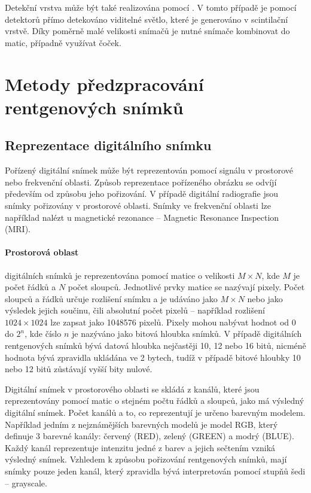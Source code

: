 Detekční vrstva může být také realizována pomocí . V tomto případě je pomocí  detektorů přímo detekováno viditelné světlo, které je generováno v scintilační vrstvě. Díky poměrně malé velikosti  snímačů je nutné snímače kombinovat do matic, případně využívat čoček.

\section{Metody předzpracování rentgenových snímků}

\subsection{Reprezentace digitálního snímku}
Pořízený digitální snímek může být reprezentován pomocí signálu v prostorové nebo frekvenční oblasti. Způsob reprezentace pořízeného obrázku se odvíjí především od způsobu jeho pořizování. V případě digitální radiografie jsou snímky pořizovány v prostorové oblasti. Snímky ve frekvenční oblasti lze například nalézt u magnetické rezonance -- Magnetic Resonance Inspection (MRI).

\paragraph{Prostorová oblast}
digitálních snímků je reprezentována pomocí matice o velikosti $M \times N$, kde $M$ je počet řádků a $N$ počet sloupců. Jednotlivé prvky matice se nazývají pixely. Počet sloupců a řádků určuje rozlišení snímku a je udáváno jako $M \times N$ nebo jako výsledek jejich součinu, čili absolutní počet pixelů -- například rozlišení $1024 \times 1024$ lze zapsat jako \num{1048576} pixelů.  Pixely mohou nabývat hodnot od 0 do $2^{n}$, kde číslo $n$ je nazýváno jako bitová hloubka snímků. V případě digitálních rentgenových snímků bývá datová hloubka nejčastěji 10, 12 nebo 16 bitů, nicméně hodnota bývá zpravidla ukládána ve 2 bytech, tudíž v případě bitové hloubky 10 nebo 12 bitů zůstávají vyšší bity nulové.

Digitální snímek v prostorového oblasti se skládá z kanálů, které jsou reprezentovány pomocí matic o stejném počtu řádků a sloupců, jako má výsledný digitální snímek. Počet kanálů a to, co reprezentují je určeno barevným modelem. Například jedním z nejznámějších barevných modelů je model RGB, který definuje 3 barevné kanály: červený (RED), zelený (GREEN) a modrý (BLUE). Každý kanál reprezentuje intenzitu jedné z barev a jejich sečtením vzniká výsledný snímek. Vzhledem k způsobu pořizování rentgenových snímků, mají snímky pouze jeden kanál, který zpravidla bývá interpretován pomocí stupňů šedi -- grayscale.

